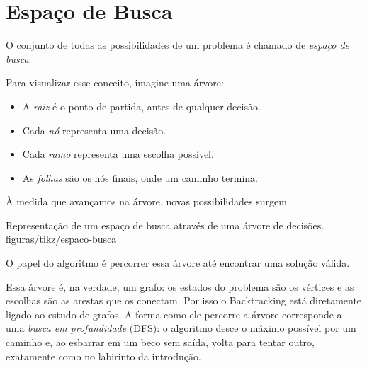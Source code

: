 \section{Espaço de Busca}

O conjunto de todas as possibilidades de um problema é chamado de \emph{espaço de busca}.

Para visualizar esse conceito, imagine uma árvore:

\begin{itemize}[leftmargin=1.4em]
  \item A \emph{raiz} é o ponto de partida, antes de qualquer decisão.
  \item Cada \emph{nó} representa uma decisão.
  \item Cada \emph{ramo} representa uma escolha possível.
  \item As \emph{folhas} são os nós finais, onde um caminho termina.
\end{itemize}

À medida que avançamos na árvore, novas possibilidades surgem.

%
  {Representação de um espaço de busca através de uma árvore de decisões.}%
  {figuras/tikz/espaco-busca}

O papel do algoritmo é percorrer essa árvore até encontrar uma solução válida.

Essa árvore é, na verdade, um grafo: os estados do problema são os vértices e as escolhas são as arestas que os conectam. Por isso o Backtracking está diretamente ligado ao estudo de grafos. A forma como ele percorre a árvore corresponde a uma \emph{busca em profundidade} (DFS): o algoritmo desce o máximo possível por um caminho e, ao esbarrar em um beco sem saída, volta para tentar outro, exatamente como no labirinto da introdução.
